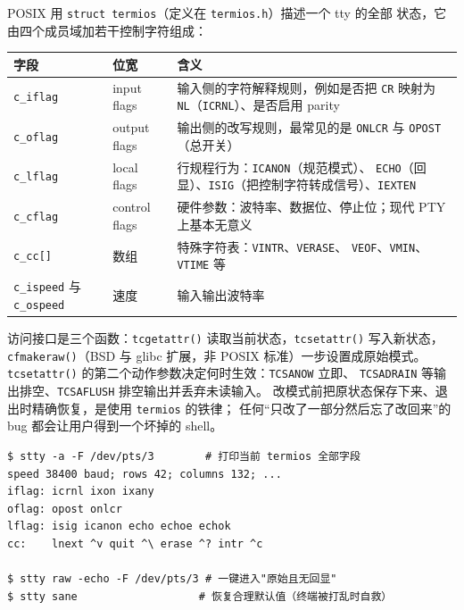 \documentclass[12pt,a4paper,fontset=fandol]{ctexbook}
\newcommand{\Fn}[1]{\texttt{#1()}}
\newcommand{\Tp}[1]{\texttt{#1}}
\begin{document}
POSIX 用 \Tp{struct termios}（定义在 \Tp{termios.h}）描述一个 tty 的全部
状态，它由四个成员域加若干控制字符组成：

\begin{center}
\begin{tabular}{@{}>{\raggedright\arraybackslash}p{}
                 >{\raggedright\arraybackslash}p{}
                 >{\raggedright\arraybackslash}p{}@{}}
\toprule
字段 & 位宽 & 含义 \\
\midrule
\Tp{c\_iflag} & input flags  & 输入侧的字符解释规则，例如是否把 \Tp{CR} 映射为
\Tp{NL}（\Tp{ICRNL}）、是否启用 parity \\
\Tp{c\_oflag} & output flags & 输出侧的改写规则，最常见的是 \Tp{ONLCR} 与
\Tp{OPOST}（总开关） \\
\Tp{c\_lflag} & local flags  & 行规程行为：\Tp{ICANON}（规范模式）、
\Tp{ECHO}（回显）、\Tp{ISIG}（把控制字符转成信号）、\Tp{IEXTEN} \\
\Tp{c\_cflag} & control flags & 硬件参数：波特率、数据位、停止位；现代 PTY
上基本无意义 \\
\Tp{c\_cc[]} & 数组 & 特殊字符表：\Tp{VINTR}、\Tp{VERASE}、
\Tp{VEOF}、\Tp{VMIN}、\Tp{VTIME} 等 \\
\Tp{c\_ispeed} 与 \Tp{c\_ospeed} & 速度 & 输入输出波特率 \\
\bottomrule
\end{tabular}
\end{center}

访问接口是三个函数：\Fn{tcgetattr} 读取当前状态，\Fn{tcsetattr} 写入新状态，
\Fn{cfmakeraw}（BSD 与 glibc 扩展，非 POSIX 标准）一步设置成原始模式。
\Fn{tcsetattr} 的第二个动作参数决定何时生效：\Tp{TCSANOW} 立即、
\Tp{TCSADRAIN} 等输出排空、\Tp{TCSAFLUSH} 排空输出并丢弃未读输入。
改模式前把原状态保存下来、退出时精确恢复，是使用 \Tp{termios} 的铁律；
任何``只改了一部分然后忘了改回来''的 bug 都会让用户得到一个坏掉的 shell。

\begin{lstlisting}[style=shellstyle,caption={用 stty 观察与修改当前 tty 状态}]
$ stty -a -F /dev/pts/3        # 打印当前 termios 全部字段
speed 38400 baud; rows 42; columns 132; ...
iflag: icrnl ixon ixany
oflag: opost onlcr
lflag: isig icanon echo echoe echok
cc:    lnext ^v quit ^\ erase ^? intr ^c

$ stty raw -echo -F /dev/pts/3 # 一键进入"原始且无回显"
$ stty sane                   # 恢复合理默认值（终端被打乱时自救）
\end{lstlisting}
\end{document}
